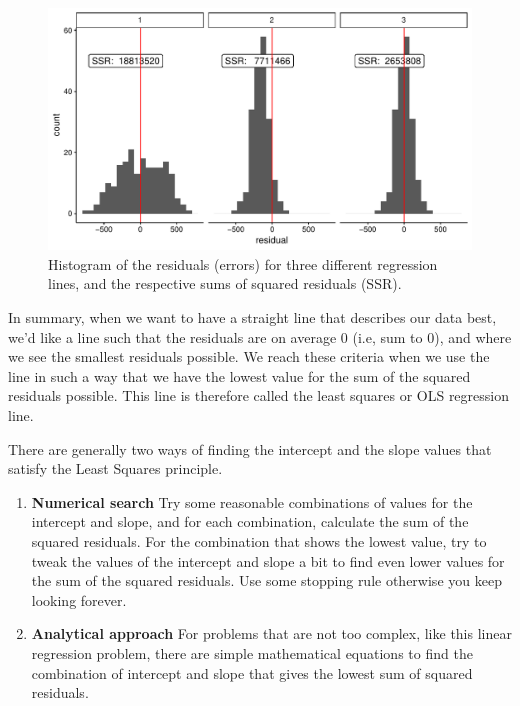 \documentclass[]{book}\usepackage[]{graphicx}\usepackage[]{color}
\makeatletter
\def\maxwidth{ %
  \ifdim\Gin@nat@width>\linewidth
    \linewidth
  \else
    \Gin@nat@width
  \fi
}
\newenvironment{knitrout}{}{} %
\makeatother
\begin{document}
\begin{knitrout}
\color{fgcolor}\begin{figure}

{\centering \includegraphics[width=\maxwidth]{figure/lm_14-1} 

}

\caption[Histogram of the residuals (errors) for three different regression lines, and the respective sums of squared residuals (SSR)]{Histogram of the residuals (errors) for three different regression lines, and the respective sums of squared residuals (SSR).}\label{fig:lm_14}
\end{figure}


\end{knitrout}

In summary, when we want to have a straight line that describes our data best, we'd like a line such that the residuals are on average 0 (i.e, sum to 0), and where we see the smallest residuals possible. We reach these criteria when we use the line in such a way that we have the lowest value for the sum of the squared residuals possible. This line is therefore called the least squares or OLS regression line.

There are generally two ways of finding the intercept and the slope values that satisfy the Least Squares principle.

\begin{enumerate}
\item
\textbf{Numerical search} Try some reasonable combinations of values for the intercept and slope, and for each combination, calculate the sum of the squared residuals. For the combination that shows the lowest value, try to tweak the values of the intercept and slope a bit to find even lower values for the sum of the squared residuals. Use some stopping rule otherwise you keep looking forever.
\item
\textbf{Analytical approach} For problems that are not too complex, like this linear regression problem, there are simple mathematical equations to find the combination of intercept and slope that gives the lowest sum of squared residuals. 

\end{enumerate}
\end{document}
